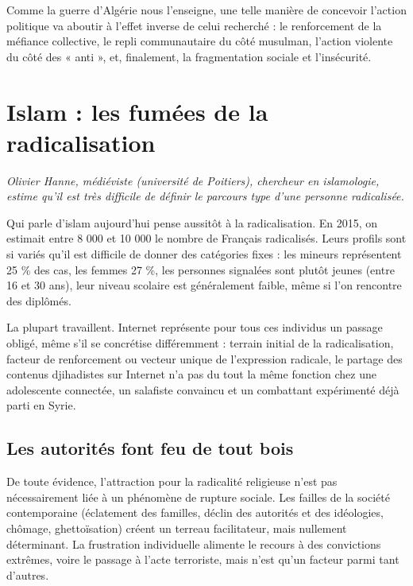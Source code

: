 Comme la guerre d'Algérie nous l'enseigne, une telle manière de
concevoir l'action politique va aboutir à l'effet inverse de celui
recherché : le renforcement de la méfiance collective, le repli
communautaire du côté musulman, l'action violente du côté des « anti »,
et, finalement, la fragmentation sociale et l'insécurité.

\section{Islam : les fumées de la radicalisation}
\textit{Olivier Hanne, médiéviste (université de Poitiers), chercheur en
islamologie, estime qu'il est très difficile de définir le parcours type
d'une personne radicalisée.}
 

Qui parle d'islam aujourd'hui pense aussitôt à la radicalisation. En
2015, on estimait entre 8 000 et 10 000 le nombre de Français
radicalisés. Leurs profils sont si variés qu'il est difficile de donner
des catégories fixes : les mineurs représentent 25 \% des cas, les
femmes 27 \%, les personnes signalées sont plutôt jeunes (entre 16 et 30
ans), leur niveau scolaire est généralement faible, même si l'on
rencontre des diplômés.

La plupart travaillent. Internet représente pour tous ces individus un
passage obligé, même s'il se concrétise différemment : terrain initial
de la radicalisation, facteur de renforcement ou vecteur unique de
l'expression radicale, le partage des contenus djihadistes sur Internet
n'a pas du tout la même fonction chez une adolescente connectée, un
salafiste convaincu et un combattant expérimenté déjà parti en Syrie.

\subsection{Les autorités font feu de tout bois}

De toute évidence, l'attraction pour la radicalité religieuse n'est pas
nécessairement liée à un phénomène de rupture sociale. Les failles de la
société contemporaine (éclatement des familles, déclin des autorités et
des idéologies, chômage, ghettoïsation) créent un terreau facilitateur,
mais nullement déterminant. La frustration individuelle alimente le
recours à des convictions extrêmes, voire le passage à l'acte
terroriste, mais n'est qu'un facteur parmi tant d'autres.

